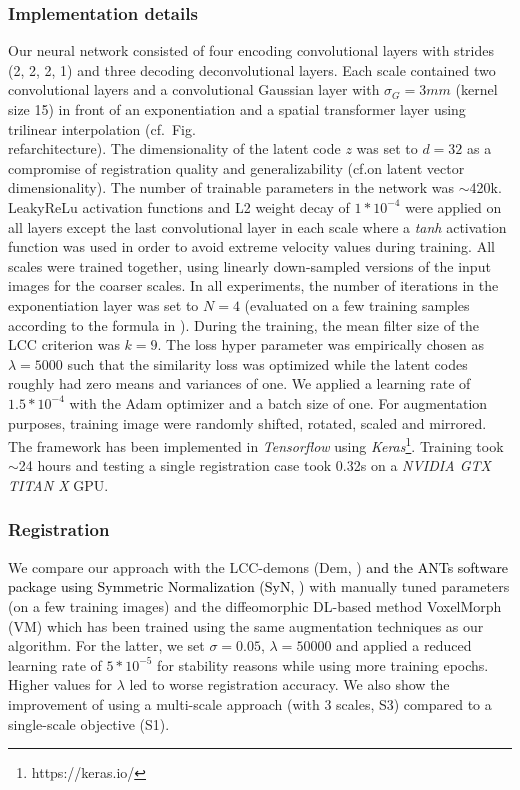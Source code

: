 \documentclass[journal]{IEEEtran}
\newcommand{\update}[1]{\textcolor{black}{#1}}
\begin{document}
\subsubsection{Implementation details} Our neural network consisted of four encoding convolutional layers with strides (2, 2, 2, 1) and three decoding deconvolutional layers. Each scale contained two convolutional layers and a convolutional Gaussian layer with $\sigma_G=3mm$ (kernel size 15) in front of an exponentiation and a spatial transformer layer using trilinear interpolation (cf.~Fig.\\ref{architecture}). The dimensionality of the latent code $z$ was set to $d=32$ as a compromise of registration quality and generalizability (cf.\experiment on latent vector dimensionality). The number of trainable parameters in the network was $\sim$420k. LeakyReLu activation functions and L2 weight decay of $1*10^{-4}$ were applied on all layers except the last convolutional layer in each scale where a \emph{tanh} activation function was used in order to avoid extreme velocity values during training. All scales were trained together, using linearly down-sampled versions of the input images for the coarser scales. In all experiments, the number of iterations in the exponentiation layer was set to $N=4$  (evaluated on a few training samples according to the formula in \cite{arsigny2006log}). During the training, the mean filter size of the LCC criterion was $k=9$. The loss hyper parameter was empirically chosen as $\lambda=5000$ such that the similarity loss was optimized while the latent codes roughly had zero means and variances of one. We applied a learning rate of $1.5*10^{-4}$ with the Adam optimizer and a batch size of one. For augmentation purposes, training image were randomly shifted, rotated, scaled and mirrored. The framework has been implemented in \textit{Tensorflow} using \textit{Keras}\footnote{https://keras.io/}. Training took $\sim$24 hours and testing a single registration case took 0.32s on a \textit{NVIDIA GTX TITAN X} GPU. %

\subsubsection{Registration}
We compare our approach with the LCC-demons (Dem, \cite{lorenzi2013lcc}) \update{and the ANTs software package using Symmetric Normalization (SyN, \cite{avants2008symmetric})} with manually tuned parameters (on a few training images) and the diffeomorphic DL-based method VoxelMorph \cite{dalca2018unsupervised} (VM) which has been trained using the same augmentation techniques as our algorithm. For the latter, we set $\sigma=0.05$, $\lambda=50000$ and applied a reduced learning rate of $5*10^{-5}$ for stability reasons while using more training epochs. Higher values for $\lambda$ led to worse registration accuracy. We also show the improvement of using a multi-scale approach (with 3 scales, S3) compared to a single-scale objective (S1). 
\end{document}
